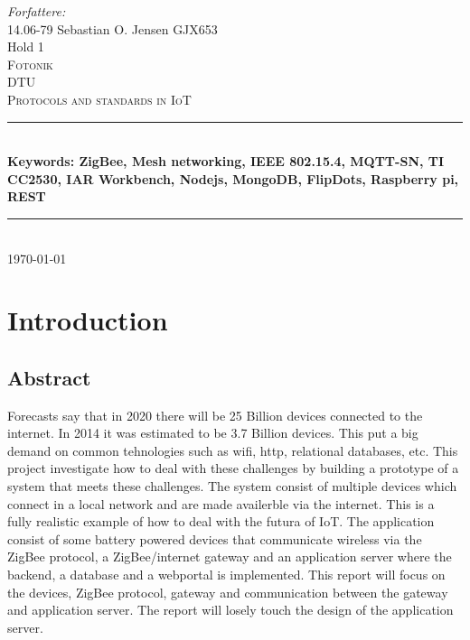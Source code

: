\documentclass[a4paper,12pt,english]{article}
\begin{document}
\begin{titlepage}

\newcommand{\HRule}{\rule{\linewidth}{0.4mm}}
\center
\small{ \emph{Forfattere:}\\
14.06-79 Sebastian O. Jensen \textsc{GJX653}
\\
Hold 1} \\[2cm]

\textsc{\LARGE Fotonik}\\[0.5cm]
\textsc{\large DTU}\\[1.5cm]
\textsc{\huge Protocols and standards in IoT}\\
\HRule \\[0.7cm]
{\bfseries Keywords: ZigBee, Mesh networking, IEEE 802.15.4, MQTT-SN,
TI CC2530, IAR Workbench, Nodejs, MongoDB, FlipDots, Raspberry pi,
REST}\\[0.4cm]
\HRule
\\[1.5cm] \textsc{\Large \textsc{\today}}\\[0.5cm]



\end{titlepage}
\tableofcontents

\section{Introduction}	
\subsection{Abstract}
Forecasts say that in 2020 there will be 25 Billion devices connected to the
internet. In 2014 it was estimated to be 3.7 Billion devices\cite{Gartner}.
This put a big demand on common tehnologies such as wifi, http, relational
databases, etc. This project investigate how to deal with these challenges by
building a prototype of a system that meets these challenges. The system
consist of multiple devices which connect in a local network and are made
availerble via the internet. This is a fully realistic example of how to deal
with the futura of IoT. The
application consist of some battery powered devices that communicate wireless
via the ZigBee protocol, a ZigBee/internet gateway and an application server
where the backend, a database and a webportal is implemented. This report will
focus on the devices, ZigBee protocol, gateway and communication between the
gateway and application server. The report will losely touch the design of the
application server.
\end{document}
